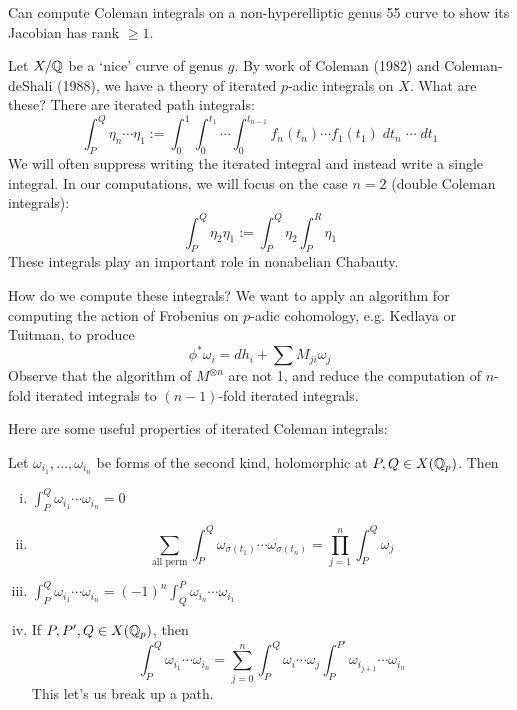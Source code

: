 \begin{ex}[B-Tuitman]
Can compute Coleman integrals on a non-hyperelliptic genus 55 curve to show its Jacobian has rank $\geq 1$.
\end{ex}


Let $X/\mathbb{Q}$ be a `nice' curve of genus $g$. By work of Coleman (1982) and Coleman-deShali (1988), we have a theory of iterated $p$-adic integrals on $X$. What are these? There are iterated path integrals:
	\[
	\int_P^Q \eta_n \cdots \eta_1:= \int_0^1 \int_0^{t_1} \cdots \int_0^{t_{n-1}} f_n(t_n) \cdots f_1(t_1) \;dt_n \; \cdots \; dt_1
	\]
We will often suppress writing the iterated integral and instead write a single integral. In our computations, we will focus on the case $n=2$ (double Coleman integrals):
	\[
	\int_P^Q \eta_2 \eta_1:= \int_P^Q \eta_2 \int_P^R \eta_1
	\]
These integrals play an important role in nonabelian Chabauty.


How do we compute these integrals? We want to apply an algorithm for computing the action of Frobenius on $p$-adic cohomology, e.g. Kedlaya or Tuitman, to produce
	\[
	\phi^* \omega_i= dh_i + \sum M_{ji} \omega_j
	\]
Observe that the algorithm of $M^{\otimes n}$ are not 1, and reduce the computation of $n$-fold iterated integrals to $(n-1)$-fold iterated integrals. 


Here are some useful properties of iterated Coleman integrals:


\begin{prop}
Let $\omega_{i_1}, \ldots, \omega_{i_n}$ be forms of the second kind, holomorphic at $P,Q \in X(\mathbb{Q}_p)$. Then
\begin{enumerate}[(i)]
\item $\int_P^Q \omega_{i_1} \cdots \omega_{i_n}= 0$
\item
	\[
	\sum_{\text{all perm}} \int_P^Q \omega_{\sigma(t_1)} \cdots \omega_{\sigma(t_n)}= \prod_{j=1}^n \int_P^Q \omega_j
	\]
\item $\int_P^Q \omega_{i_1} \cdots \omega_{i_n}= (-1)^n \int_Q^P \omega_{i_n} \cdots \omega_{i_1}$
\item If $P,P', Q \in X(\mathbb{Q}_p)$, then
	\[
	\int_P^Q \omega_{i_1} \cdots \omega_{i_n}= \sum_{j=0}^n \int_P^Q \omega_i \cdots \omega_j \int_P^{P'} \omega_{i_{j+1}} \cdots \omega_{i_n}
	\]
This let's us break up a path.
\end{enumerate}
\end{prop}


